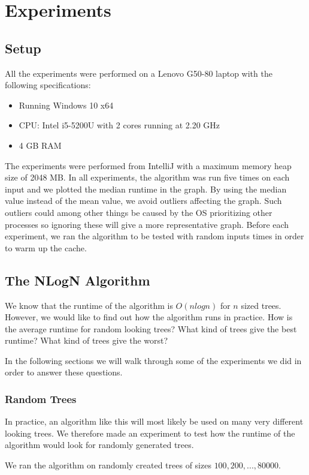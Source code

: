 \chapter{Experiments}
\section{Setup}
All the experiments were performed on a Lenovo G50-80 laptop with the following specifications:

\begin{itemize}
	\item Running Windows 10 x64
	\item CPU: Intel i5-5200U with 2 cores running at 2.20 GHz
	\item 4 GB RAM
\end{itemize}

The experiments were performed from IntelliJ with a maximum memory heap size of 2048 MB.
In all experiments, the algorithm was run five times on each input and we plotted the median runtime in the graph. By using the median value instead of the mean value, we avoid outliers affecting the graph. Such outliers could among other things be caused by the OS prioritizing other processes so ignoring these will give a more representative graph. Before each experiment, we ran the algorithm to be tested with random inputs  times in order to warm up the cache.

\section{The NLogN Algorithm}
We know that the runtime of the algorithm is $O(nlogn)$ for $n$ sized trees. However, we would like to find out how the algorithm runs in practice. How is the average runtime for random looking trees? What kind of trees give the best runtime? What kind of trees give the worst?

In the following sections we will walk through some of the experiments we did in order to answer these questions.

\subsection{Random Trees}
In practice, an algorithm like this will most likely be used on many very different looking trees. We therefore made an experiment to test how the runtime of the algorithm would look for randomly generated trees.

We ran the algorithm on randomly created trees of sizes $100, 200, ..., 80000$.

